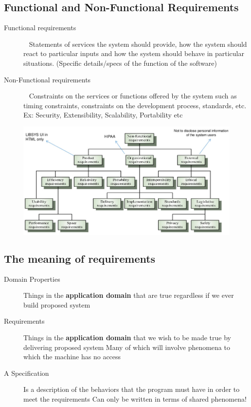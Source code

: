 \documentclass{report}
\begin{document}
\subsection{Functional and Non-Functional Requirements}
\begin{description}
  \item [Functional requirements] \ \newline
   Statements of services the system should provide, how the system should react to particular inputs and how the system should behave in particular situations. (Specific details/specs of the function of the software)
  \item [Non-Functional requirements] \ \newline
   Constraints on the services or functions offered by the system such as timing constraints, constraints on the development process, standards, etc. Ex: Security, Extensibility, Scalability, Portability etc
\end{description}
\begin{figure}[H]
\centering
\includegraphics[scale=.45]{assets/CEN4010_Non-Function_Requirements.jpg}
\end{figure}


\subsection{The meaning of requirements}
\begin{description}
  \item [Domain Properties] Things in the \textbf{application domain} that are true regardless if we ever build  proposed system
  \item [Requirements] Things in the \textbf{application domain} that we wish to be made true by delivering proposed system\newline
Many of which will involve phenomena to which the machine has no
access
  \item [A Specification] Is a description of the behaviors that the program must have in order to meet the requirements\newline 
Can only be written in terms of shared phenomena!
\end{description}
\end{document}
